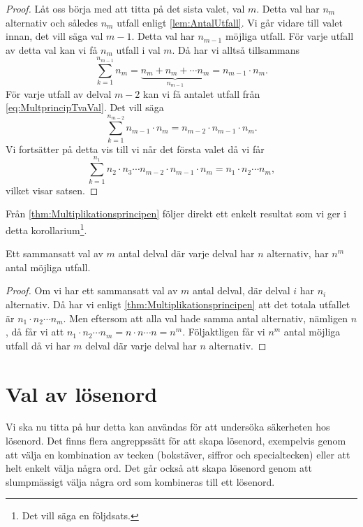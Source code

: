 \begin{proof}
  Låt oss börja med att titta på det sista valet, val \(m\).
  Detta val har \(n_m\) alternativ och således \(n_m\) utfall enligt
  \cref{lem:AntalUtfall}.
  Vi går vidare till valet innan, det vill säga val \(m-1\).
  Detta val har \(n_{m-1}\) möjliga utfall.
  För varje utfall av detta val kan vi få \(n_m\) utfall i val \(m\).
  Då har vi alltså tillsammans
  \begin{equation}\label{eq:MultprincipTvaVal}
    \sum_{k=1}^{n_{m-1}} n_m = \underbrace{n_m + n_m + \cdots
    n_m}_{n_{m-1}} = n_{m-1}\cdot n_m.
  \end{equation}
  För varje utfall av delval \(m-2\) kan vi få antalet utfall från
  \cref{eq:MultprincipTvaVal}.
  Det vill säga
  \begin{equation}
    \sum_{k=1}^{n_{m-2}} n_{m-1}\cdot n_m = n_{m-2}\cdot n_{m-1} \cdot n_m.
  \end{equation}
  Vi fortsätter på detta vis till vi når det första valet då vi får
  \begin{equation}
    \sum_{k=1}^{n_1} n_2\cdot n_3\cdots n_{m-2}\cdot n_{m-1}\cdot n_m
      = n_1\cdot n_2\cdots n_m,
  \end{equation}
  vilket visar satsen.
\end{proof}

Från \cref{thm:Multiplikationsprincipen} följer direkt ett enkelt resultat
som vi ger i detta korollarium\footnote{%
  Det vill säga en följdsats.
}.

\begin{corollary}\label{cor:SammansattValKonstAlternativ}
  Ett sammansatt val av \(m\) antal delval där varje delval har \(n\)
  alternativ, har \(n^m\) antal möjliga utfall.
\end{corollary}

\begin{proof}
  Om vi har ett sammansatt val av \(m\) antal delval, där delval
  \(i\) har \(n_i\) alternativ.
  Då har vi enligt \cref{thm:Multiplikationsprincipen} att det totala
  utfallet är \(n_1\cdot n_2\cdots n_m\).
  Men eftersom att alla val hade samma antal alternativ, nämligen \(n\), då
  får vi att \(n_1\cdot n_2\cdots n_m = n\cdot n\cdots n = n^m\).
  Följaktligen får vi \(n^m\) antal möjliga utfall då vi har \(m\) delval där
  varje delval har \(n\) alternativ.
\end{proof}



\section{Val av lösenord}
Vi ska nu titta på hur detta kan användas för att undersöka säkerheten hos
lösenord.
Det finns flera angreppssätt för att skapa lösenord, exempelvis genom att
välja en kombination av tecken (bokstäver, siffror och specialtecken) eller att
helt enkelt välja några ord.
Det går också att skapa lösenord genom att slumpmässigt välja några ord som
kombineras till ett lösenord.

